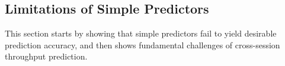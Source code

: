 
\subsection{Limitations of Simple Predictors}

This section starts by showing that simple predictors fail to yield desirable prediction accuracy, and then shows fundamental challenges of cross-session throughput prediction. 

